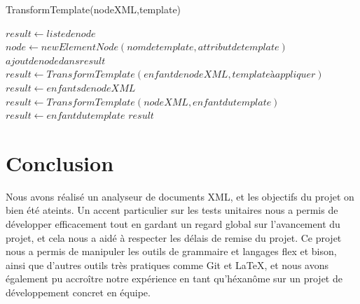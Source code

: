 \begin{algorithm}
\caption{TransformTemplate(nodeXML,template)}
\begin{algorithmic}
\STATE $result \leftarrow liste de node$
\STATE $node \leftarrow new ElementNode(nom de template,attribut de template)$
\STATE $ajout de node dans result$
\ENDIF
{}
\STATE $result \leftarrow TransformTemplate(enfant de nodeXML,template à appliquer)$
\ENDIF
{}
\STATE $result \leftarrow enfants de nodeXML$
\ENDIF
\ELSE
\STATE $result \leftarrow TransformTemplate(nodeXML,enfant du template)$
\ENDIF
\ELSE
\STATE $result \leftarrow enfant du template$
\ENDIF
\ENDFOR
\RETURN $result$
\end{algorithmic}
\end{algorithm}

\section{Conclusion}

Nous avons réalisé un analyseur de documents XML, et les objectifs du projet on bien été ateints. Un accent particulier sur les tests unitaires nous a permis de développer efficacement tout en gardant un regard global sur l'avancement du projet, et cela nous a aidé à respecter les délais de remise du projet. Ce projet nous a permis de manipuler les outils de grammaire et langages flex et bison, ainsi que d'autres outils très pratiques comme Git et \LaTeX, et nous avons également pu accroître notre expérience en tant qu'héxanôme sur un projet de développement concret en équipe.
